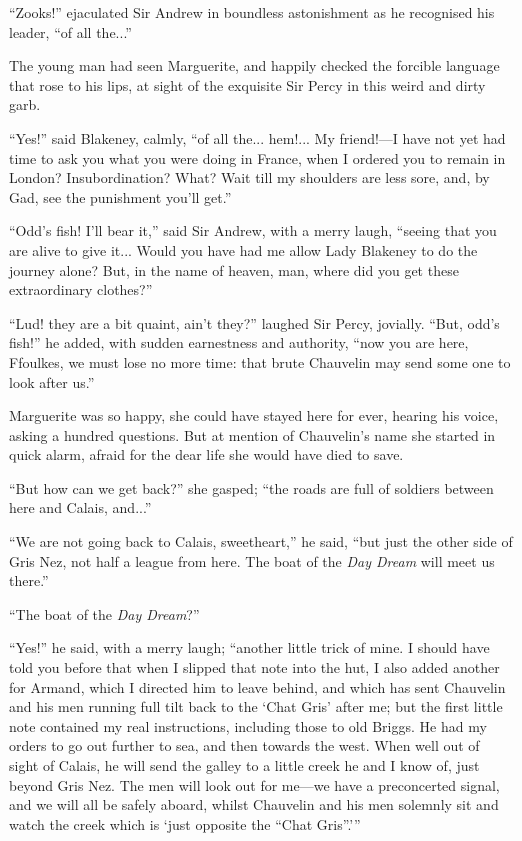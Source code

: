 \documentclass[paper=a5,BCOR=7mm,twoside,DIV=calc,12pt,usegeometry,chapterprefix,endperiod,headings=big]{scrbook}
\begin{document}
\enquote{Zooks!} ejaculated Sir Andrew in boundless astonishment as he recognised his leader, \enquote{of all the...}

The young man had seen Marguerite, and happily checked the forcible language that rose to his lips, at sight of the exquisite Sir Percy in this weird and dirty garb.

\enquote{Yes!} said Blakeney, calmly, \enquote{of all the... hem!... My friend!---I have not yet had time to ask you what you were doing in France, when I ordered you to remain in London? Insubordination? What? Wait till my shoulders are less sore, and, by Gad, see the punishment you'll get.}

\enquote{Odd's fish! I'll bear it,} said Sir Andrew, with a merry laugh, \enquote{seeing that you are alive to give it... Would you have had me allow Lady Blakeney to do the journey alone? But, in the name of heaven, man, where did you get these extraordinary clothes?}

\enquote{Lud! they are a bit quaint, ain't they?} laughed Sir Percy, jovially. \enquote{But, odd's fish!} he added, with sudden earnestness and authority, \enquote{now you are here, Ffoulkes, we must lose no more time: that brute Chauvelin may send some one to look after us.}

Marguerite was so happy, she could have stayed here for ever, hearing his voice, asking a hundred questions. But at mention of Chauvelin's name she started in quick alarm, afraid for the dear life she would have died to save.

\enquote{But how can we get back?} she gasped; \enquote{the roads are full of soldiers between here and Calais, and...}

\enquote{We are not going back to Calais, sweetheart,} he said, \enquote{but just the other side of Gris Nez, not half a league from here. The boat of the \textit{Day Dream} will meet us there.}

\enquote{The boat of the \textit{Day Dream}?}

\enquote{Yes!} he said, with a merry laugh; \enquote{another little trick of mine. I should have told you before that when I slipped that note into the hut, I also added another for Armand, which I directed him to leave behind, and which has sent Chauvelin and his men running full tilt back to the \enquote{Chat Gris} after me; but the first little note contained my real instructions, including those to old Briggs. He had my orders to go out further to sea, and then towards the west. When well out of sight of Calais, he will send the galley to a little creek he and I know of, just beyond Gris Nez. The men will look out for me---we have a preconcerted signal, and we will all be safely aboard, whilst Chauvelin and his men solemnly sit and watch the creek which is \enquote{just opposite the ``Chat Gris''.}}
\end{document}
